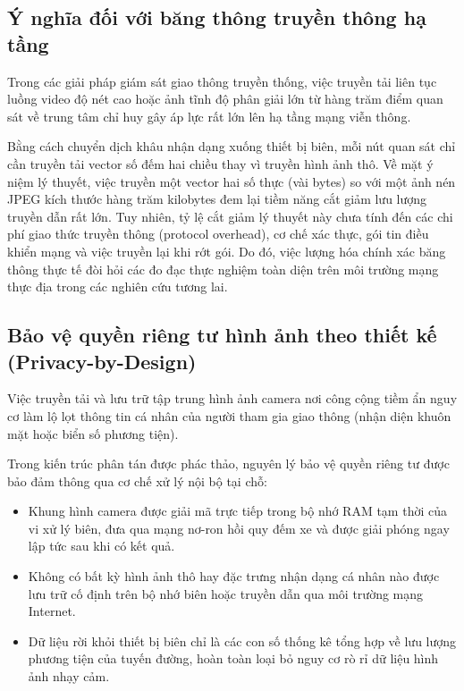\subsection{Ý nghĩa đối với băng thông truyền thông hạ tầng}
Trong các giải pháp giám sát giao thông truyền thống, việc truyền tải liên tục luồng video độ nét cao hoặc ảnh tĩnh độ phân giải lớn từ hàng trăm điểm quan sát về trung tâm chỉ huy gây áp lực rất lớn lên hạ tầng mạng viễn thông. 

Bằng cách chuyển dịch khâu nhận dạng xuống thiết bị biên, mỗi nút quan sát chỉ cần truyền tải vector số đếm hai chiều thay vì truyền hình ảnh thô. Về mặt ý niệm lý thuyết, việc truyền một vector hai số thực (vài bytes) so với một ảnh nén JPEG kích thước hàng trăm kilobytes đem lại tiềm năng cắt giảm lưu lượng truyền dẫn rất lớn. Tuy nhiên, tỷ lệ cắt giảm lý thuyết này chưa tính đến các chi phí giao thức truyền thông (protocol overhead), cơ chế xác thực, gói tin điều khiển mạng và việc truyền lại khi rớt gói. Do đó, việc lượng hóa chính xác băng thông thực tế đòi hỏi các đo đạc thực nghiệm toàn diện trên môi trường mạng thực địa trong các nghiên cứu tương lai.

\subsection{Bảo vệ quyền riêng tư hình ảnh theo thiết kế (Privacy-by-Design)}
Việc truyền tải và lưu trữ tập trung hình ảnh camera nơi công cộng tiềm ẩn nguy cơ làm lộ lọt thông tin cá nhân của người tham gia giao thông (nhận diện khuôn mặt hoặc biển số phương tiện).

Trong kiến trúc phân tán được phác thảo, nguyên lý bảo vệ quyền riêng tư được bảo đảm thông qua cơ chế xử lý nội bộ tại chỗ:
\begin{itemize}
    \item Khung hình camera được giải mã trực tiếp trong bộ nhớ RAM tạm thời của vi xử lý biên, đưa qua mạng nơ-ron hồi quy đếm xe và được giải phóng ngay lập tức sau khi có kết quả.
    \item Không có bất kỳ hình ảnh thô hay đặc trưng nhận dạng cá nhân nào được lưu trữ cố định trên bộ nhớ biên hoặc truyền dẫn qua môi trường mạng Internet.
    \item Dữ liệu rời khỏi thiết bị biên chỉ là các con số thống kê tổng hợp về lưu lượng phương tiện của tuyến đường, hoàn toàn loại bỏ nguy cơ rò rỉ dữ liệu hình ảnh nhạy cảm.
\end{itemize}

